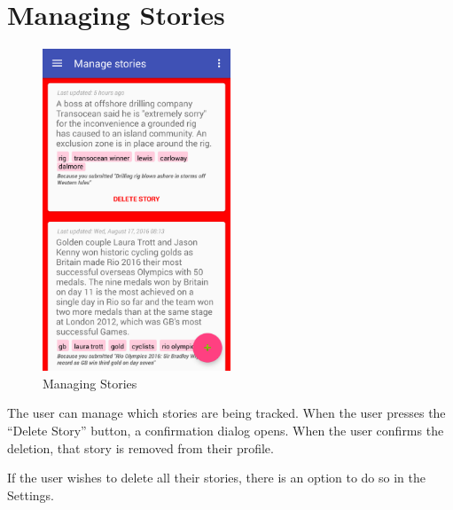 \documentclass[11pt,titlepage]{report}
\begin{document}
\section{Managing Stories}
\begin{figure}
	\vspace{-1cm}
	\begin{center}
		\includegraphics[width=0.5\textwidth]{img/manageStories.png}
	\end{center}
	\caption{Managing Stories}
	\vspace{-11.5cm}
\end{figure}
The user can manage which stories are being tracked. When the user presses the ``Delete Story'' button, a confirmation dialog opens. When the user confirms the deletion, that story is removed from their profile. 

If the user wishes to delete all their stories, there is an option to do so in the Settings.
\newpage
\end{document}

